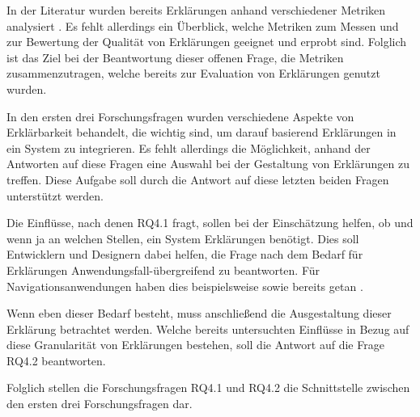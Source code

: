 In der Literatur wurden bereits Erklärungen anhand verschiedener Metriken analysiert \cite{wiegand2019drive,briand1995goal}. Es fehlt allerdings ein Überblick, welche Metriken zum Messen und zur Bewertung der Qualität von Erklärungen geeignet und erprobt sind. Folglich ist das Ziel bei der Beantwortung dieser offenen Frage, die Metriken zusammenzutragen, welche bereits zur Evaluation von Erklärungen genutzt wurden.

\smallskip

\noindent{}

\smallskip

In den ersten drei Forschungsfragen wurden verschiedene Aspekte von Erklärbarkeit behandelt, die wichtig sind, um darauf basierend Erklärungen in ein System zu integrieren. Es fehlt allerdings die Möglichkeit, anhand der Antworten auf diese Fragen eine Auswahl bei der Gestaltung von Erklärungen zu treffen. Diese Aufgabe soll durch die Antwort auf diese letzten beiden Fragen unterstützt werden.

Die Einflüsse, nach denen RQ4.1 fragt, sollen bei der Einschätzung helfen, ob und wenn ja an welchen Stellen, ein System Erklärungen benötigt. Dies soll Entwicklern und Designern dabei helfen, die Frage nach dem Bedarf für Erklärungen Anwendungsfall-übergreifend zu beantworten. Für Navigationsanwendungen haben dies beispielsweise \citeauthor{chazette_end-users_nodate} sowie \citeauthor{wang_integration_2020} bereits getan \cite{chazette_end-users_nodate,wang_integration_2020}.

Wenn eben dieser Bedarf besteht, muss anschließend die Ausgestaltung dieser Erklärung betrachtet werden. Welche bereits untersuchten Einflüsse in Bezug auf diese Granularität von Erklärungen bestehen, soll die Antwort auf die Frage RQ4.2 beantworten.

Folglich stellen die Forschungsfragen RQ4.1 und RQ4.2 die Schnittstelle zwischen den ersten drei Forschungsfragen dar.


